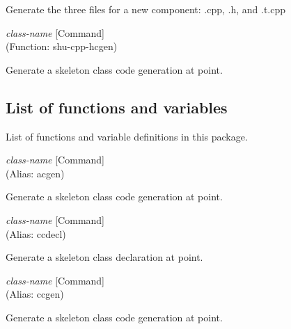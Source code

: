 \begin{doc-string}
Generate the three files for a new component: .cpp, .h, and .t.cpp
\end{doc-string}

\vspace{1em}
\noindent
{}
\usebox{\funcname}\emph{class-name}
 \hfill [Command]\\%
 (Function: shu-cpp-hcgen)

\begin{doc-string}
Generate a skeleton class code generation at point.
\end{doc-string}

\subsection{List of functions and variables}

List of functions and variable definitions in this package.



\vspace{1em}
\noindent
{}
\usebox{\funcname}\emph{class-name}
 \hfill [Command]\\%
 (Alias: acgen)

\begin{doc-string}
Generate a skeleton class code generation at point.
\end{doc-string}

\vspace{1em}
\noindent
{}
\usebox{\funcname}\emph{class-name}
 \hfill [Command]\\%
 (Alias: ccdecl)

\begin{doc-string}
Generate a skeleton class declaration at point.
\end{doc-string}

\vspace{1em}
\noindent
{}
\usebox{\funcname}\emph{class-name}
 \hfill [Command]\\%
 (Alias: ccgen)

\begin{doc-string}
Generate a skeleton class code generation at point.
\end{doc-string}

